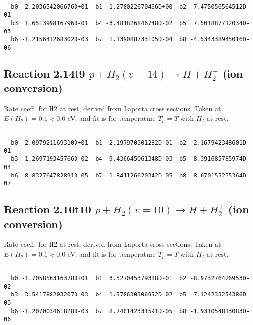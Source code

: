 \begin{small}\begin{verbatim}

  b0 -2.203654206676D+01  b1  1.278022670466D+00  b2 -7.475056564512D-01
  b3  1.651399816796D-01  b4 -3.481826846748D-02  b5  7.501887712034D-03
  b6 -1.215641268302D-03  b7  1.139088733105D-04  b8 -4.534338945016D-06

\end{verbatim}\end{small}

\newpage
\subsection{
Reaction 2.14t9
$ p + H_2(v=14) \rightarrow H + H_2^+$ (ion conversion)
}
Rate coeff. for H2 at rest, derived from Laporta cross sections.
Taken at $E(H_2) = 0.1 \approx 0.0$ eV,  and fit is for temperature $T_p=T$ with $H_2$ at rest.

\begin{small}\begin{verbatim}

  b0 -2.097921169310D+01  b1  2.197970301282D-01  b2 -2.167942348601D-01
  b3 -1.269719345766D-02  b4  9.436645061348D-03  b5 -8.391685785974D-04
  b6 -8.832764782891D-05  b7  1.841126620342D-05  b8 -8.070155235364D-07

\end{verbatim}\end{small}

\newpage
\subsection{
Reaction 2.10t10
$ p + H_2(v=10) \rightarrow H + H_2^+$ (ion conversion)
}
Rate coeff. for H2 at rest, derived from Laporta cross sections.
Taken at $E(H_2) = 0.1 \approx 0.0$ eV,  and fit is for temperature $T_p=T$ with $H_2$ at rest.

\begin{small}\begin{verbatim}

  b0 -1.705856316378D+01  b1  3.527045379388D-01  b2 -8.973276426953D-02
  b3 -3.541788203207D-03  b4 -1.578630306952D-02  b5  7.124233254386D-03
  b6 -1.207003461828D-03  b7  8.740142331591D-05  b8 -1.931054813083D-06

\end{verbatim}\end{small}

\newpage
